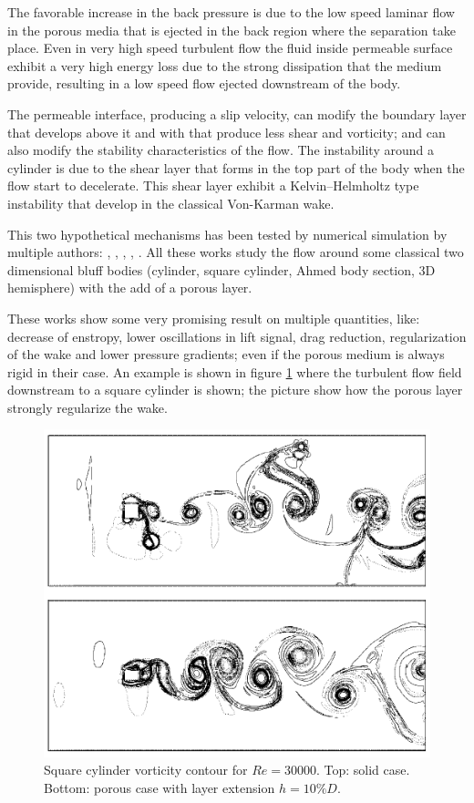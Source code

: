 The favorable increase in the back pressure is due to the low speed laminar flow in the porous media that is ejected in the back region where the separation take place.
Even in very high speed turbulent flow the fluid inside permeable surface exhibit a very high energy loss due to the strong dissipation that the medium provide, resulting in a low speed flow ejected downstream of the body.

The permeable interface, producing a slip velocity, can modify the boundary layer that develops above it and with that produce less shear and vorticity; and can also modify the stability characteristics of the flow.
The instability around a cylinder is due to the shear layer that forms in the top part of the body when the flow start to decelerate.
This shear layer exhibit a Kelvin–Helmholtz type instability that develop in the classical Von-Karman wake.

This two hypothetical mechanisms has been tested by numerical simulation by multiple authors: \citet{bruneau2004passive}, \citet{bruneau2008numerical}, \citet{bhattacharyya2011reduction}, \citet{naito2012numerical}, \citet{mimeau2017passive}.
All these works study the flow around some classical two dimensional bluff bodies (cylinder, square cylinder, Ahmed body section, 3D hemisphere) with the add of a porous layer.

These works show some very promising result on multiple quantities, like: decrease of enstropy, lower oscillations in lift signal, drag reduction, regularization of the wake and lower pressure gradients; even if the porous medium is always rigid in their case.
An example is shown in figure \ref{fig:porous_cylinder} where the turbulent flow field downstream to a square cylinder is shown; the picture show how the porous layer strongly regularize the wake.

\begin{figure}[h]
	\centering
	\includegraphics[width=0.7\linewidth]{chapter_1/cylinder_porous}
	\caption{Square cylinder vorticity contour for $Re=30000$. Top: solid case. Bottom: porous case with layer extension $h=10\% D$.}
	\label{fig:porous_cylinder}
\end{figure}


